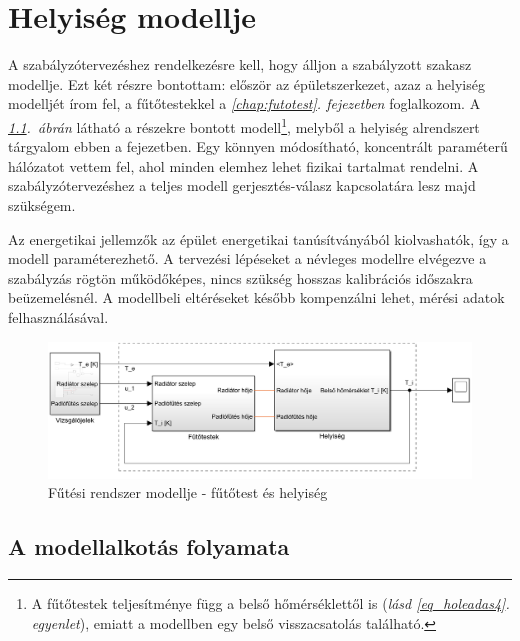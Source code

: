 \chapter{Helyiség modellje}\label{chap:helyiseg}


A szabályzótervezéshez rendelkezésre kell, hogy álljon a szabályzott szakasz modellje. Ezt két részre bontottam: először az épületszerkezet, azaz a helyiség modelljét írom fel, a fűtőtestekkel a \textit{\ref{chap:futotest}. fejezetben} foglalkozom. A \textit{\ref{fig:Simulink-minimalist}.~ábrán} látható a részekre bontott modell\footnote{A fűtőtestek teljesítménye függ a belső hőmérséklettől is (\textit{lásd \ref{eq_holeadas4}. egyenlet}), emiatt a modellben egy belső visszacsatolás található.}, melyből a helyiség alrendszert tárgyalom ebben a fejezetben. Egy könnyen módosítható, koncentrált paraméterű hálózatot vettem fel, ahol minden elemhez lehet fizikai tartalmat rendelni. A szabályzótervezéshez a teljes modell gerjesztés-válasz kapcsolatára lesz majd szükségem.

Az energetikai jellemzők az épület energetikai tanúsítványából kiolvashatók, így a modell paraméterezhető. A tervezési lépéseket a névleges modellre elvégezve a szabályzás rögtön működőképes, nincs szükség hosszas kalibrációs időszakra beüzemelésnél. A modellbeli eltéréseket később kompenzálni lehet, mérési adatok felhasználásával.%

\begin{figure}[H]
	\centering
	\includegraphics[trim=0 0 0 0, clip,width=\textwidth]{figures/simulink-network-minimalist-layout}
	\caption{Fűtési rendszer modellje - fűtőtest és helyiség}
	\label{fig:Simulink-minimalist}
\end{figure}

\section{A modellalkotás folyamata}
%

